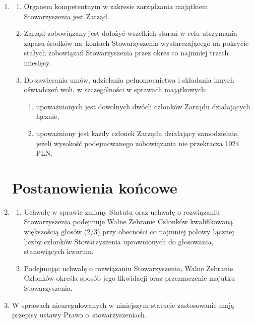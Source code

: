 \documentclass[chapterprefix,notitlepage]{article}
\begin{document}
\begin{enumerate}
	\item \begin{enumerate}
		\item Organem kompetentnym w zakresie zarządzania majątkiem Stowarzyszenia jest Zarząd.
		\item Zarząd zobowiązany jest dołożyć wszelkich starań w celu utrzymania zapasu środków na~kontach Stowarzyszenia wystarczającego na pokrycie stałych zobowiązań Stowarzyszenia przez okres co najmniej trzech miesięcy.
		\item Do zawierania umów, udzielania pełnomocnictwa i składania innych oświadczeń woli, w szczególności w sprawach majątkowych:
		\begin{enumerate}
			\item upoważnionych jest dowolnych dwóch członków Zarządu działających łącznie,
			\item upoważniony jest każdy członek Zarządu działający samodzielnie, jeżeli wysokość podejmowanego zobowiązania nie przekracza 1024 PLN.
		\end{enumerate}
	\end{enumerate}
	

\section{Postanowienia końcowe}
	
	\item \begin{enumerate}
		\item Uchwałę w sprawie zmiany Statutu oraz uchwałę o rozwiązaniu Stowarzyszenia podejmuje Walne Zebranie Członków kwalifikowaną większością głosów (2/3) przy obecności co najmniej połowy łącznej liczby członków Stowarzyszenia uprawnionych do głosowania, stanowiących kworum.
		\item Podejmując uchwałę o rozwiązaniu Stowarzyszenia, Walne Zebranie Członków określa sposób jego likwidacji oraz przeznaczenie majątku Stowarzyszenia.
	\end{enumerate}		
	
	\item  W sprawach nieuregulowanych w niniejszym statucie zastosowanie mają przepisy ustawy Prawo o~stowarzyszeniach.
			
\end{enumerate}
\end{document}
